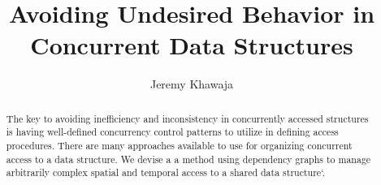 \documentclass[english]{article}
\begin{document}
	
\hypersetup{
	linktoc=all,     %
	linkcolor=blue,  %
}

\title{Avoiding Undesired Behavior in Concurrent Data Structures}
\author{Jeremy Khawaja}
\maketitle

\begin{abstract}
		The key to avoiding inefficiency and inconsistency in concurrently accessed structures is having well-defined concurrency control patterns to utilize in defining access procedures. There are many approaches available to use for organizing concurrent access to a data structure. We devise a a method using dependency graphs to manage arbitrarily complex spatial and temporal access to a shared data structure`.
\end{abstract}
\twocolumn



%
%
%


\end{document}
